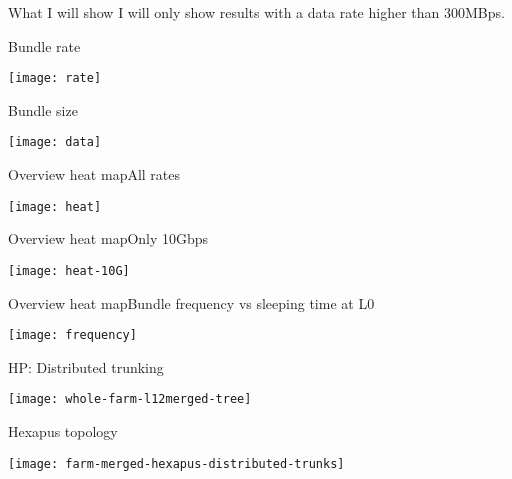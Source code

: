 \begin{frame}{What I will show}{}
	I will only show results with a data rate higher than 300MBps.  
\end{frame}

\begin{frame}{Bundle rate}{}
	\begin{center} 
		\texttt{[image: rate]}
	\end{center} 
\end{frame}

\begin{frame}{Bundle size}{}
	\begin{center} 
		\texttt{[image: data]}
	\end{center} 
\end{frame}

\begin{frame}{Overview heat map}{All rates}
	\begin{center} 
		\texttt{[image: heat]}
	\end{center} 
\end{frame}

\begin{frame}{Overview heat map}{Only 10Gbps}
	\begin{center} 
		\texttt{[image: heat-10G]}
	\end{center} 
\end{frame}

\begin{frame}{Overview heat map}{Bundle frequency vs sleeping time at L0}
	\begin{center} 
		\texttt{[image: frequency]}
	\end{center} 
\end{frame}

\begin{frame}{HP: Distributed trunking}{}
	\begin{center} 
		\texttt{[image: whole-farm-l12merged-tree]}
	\end{center} 
\end{frame}

\begin{frame}{Hexapus topology}{}
	\begin{center} 
		\texttt{[image: farm-merged-hexapus-distributed-trunks]}
	\end{center} 
\end{frame}